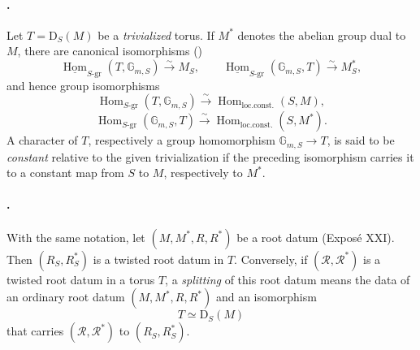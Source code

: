 \paragraph{.}
Let \(T=\mathrm D_S(M)\) be a \emph{trivialized} torus. If \(M^*\)
denotes the abelian group dual to \(M\), there are canonical
isomorphisms ()
\[
  \underline{\operatorname{Hom}}_{S\text{-gr}}
    (T,\mathbb G_{m,S})
  \xrightarrow{\sim} M_S,
  \qquad
  \underline{\operatorname{Hom}}_{S\text{-gr}}
    (\mathbb G_{m,S},T)
  \xrightarrow{\sim} M^*_S,
\]
and hence group isomorphisms
\[
  \operatorname{Hom}_{S\text{-gr}}(T,\mathbb G_{m,S})
  \xrightarrow{\sim}
  \operatorname{Hom}_{\mathrm{loc.const.}}(S,M),
\]
\[
  \operatorname{Hom}_{S\text{-gr}}(\mathbb G_{m,S},T)
  \xrightarrow{\sim}
  \operatorname{Hom}_{\mathrm{loc.const.}}(S,M^*).
\]
A character of \(T\), respectively a group homomorphism
\(\mathbb G_{m,S}\to T\), is said to be \emph{constant} relative to
the given trivialization if the preceding isomorphism carries it to
a constant map from \(S\) to \(M\), respectively to \(M^*\).

\paragraph{.}
With the same notation, let \((M,M^*,R,R^*)\) be a root datum
(Exposé XXI). Then \((R_S,R^*_S)\) is a twisted root datum in \(T\).
Conversely, if \((\mathcal R,\mathcal R^*)\) is a twisted root datum
in a torus \(T\), a \emph{splitting} of this root datum means the
data of an ordinary root datum \((M,M^*,R,R^*)\) and an isomorphism
\[
  T\simeq\mathrm D_S(M)
\]
that carries \((\mathcal R,\mathcal R^*)\) to \((R_S,R^*_S)\).

